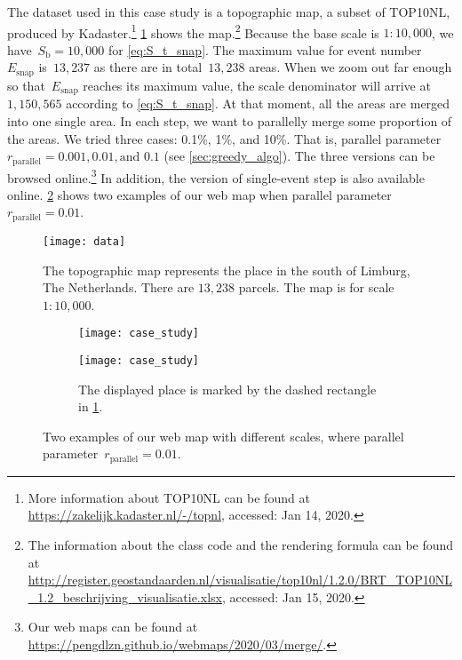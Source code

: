 \documentclass[ijgi,article,submit,moreauthors,pdftex]{Definitions/mdpi}
\begin{document}
The dataset used in this case study is a topographic map, 
a subset of TOP10NL,
produced by Kadaster.\footnote{%
More information about TOP10NL can be found at
\url{https://zakelijk.kadaster.nl/-/topnl},
accessed: Jan 14, 2020.}
%
\figs\ref{fig:data} shows the map.\footnote{%
The information about the class code and the rendering formula can be found at
\url{http://register.geostandaarden.nl/visualisatie/top10nl/1.2.0/BRT_TOP10NL_1.2_beschrijving_visualisatie.xlsx},
accessed: Jan 15, 2020.}
%
Because the base scale is $1:10{,}000$, 
we have~$S_\mathrm{b} = 10{,}000$ for \eq\ref{eq:S_t_snap}.
The maximum value for event number~$E_\mathrm{snap}$ is~$13{,}237$
as there are in total~$13{,}238$ areas.
When we zoom out far enough 
so that~$E_\mathrm{snap}$ reaches its maximum value,
the scale denominator will arrive at~$1{,}150{,}565$
according to \eq\ref{eq:S_t_snap}.
At that moment, all the areas are merged into one single area.
In each step, we want to parallelly merge some proportion of the areas.
We tried three cases: 0.1\%, 1\%, and 10\%.
That is, parallel parameter~$r_\mathrm{parallel}=0.001, 0.01, \text{and~} 0.1$ 
(see \sect\ref{sec:greedy_algo}).
The three versions can be browsed online.\footnote{%
Our web maps can be found at
\url{https://pengdlzn.github.io/webmaps/2020/03/merge/}.} 
In addition, the version of single-event step is also available online.
\fig\ref{fig:web_map} shows two examples of our web map when 
parallel parameter~$r_\mathrm{parallel}=0.01$.

\begin{figure}[tb]
\centering
\texttt{[image: data]}
\caption{
    The topographic map represents the place 
    in the south of Limburg, The Netherlands.
    There are $13{,}238$ parcels.
    The map is for scale $1:10{,}000$.}
\label{fig:data}
\end{figure}


\begin{figure}[tb]
\centering
\begin{subfigure}[t]{\textwidth}
\centering
\texttt{[image: case\_study]}
\caption{}
\end{subfigure}
\newline
\vspace{0.3cm}
%
\begin{subfigure}[t]{\textwidth}
\centering
\texttt{[image: case\_study]}
\caption{The displayed place is marked 
    by the dashed rectangle in \fig\ref{fig:data}.}
\end{subfigure}
\caption{Two examples of our web map with different scales,
    where parallel parameter~$r_\mathrm{parallel}= 0.01$.
    }
\label{fig:web_map}
\end{figure}
\end{document}
